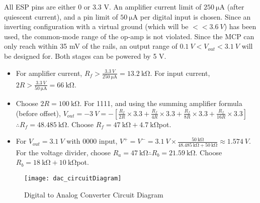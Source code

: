 All ESP pins are either 0 or 3.3 V. An amplifier current limit of $\SI{250}{\micro\ampere}$ (after quiescent current),
and a pin limit of $\SI{50}{\micro\ampere}$ per digital input is chosen. Since an inverting configuration with a virtual ground (which will be $<< \SI{3.6}{V}$) has been used,
the common-mode range of the op-amp is not violated. Since the MCP can only reach within 35 mV of the rails, an output range of $\SI{0.1}{V} < V_{out} < \SI{3.1}{V}$ will be designed for.
Both stages can be powered by 5 V.
\begin{itemize}
    \item For amplifier current, $R_f > \frac{\SI{3.3}{V}}{\SI{250}{\micro\ampere}} = \SI{13.2}{\kilo\ohm}$.
          For input current, $2R > \frac{\SI{3.3}{V}}{\SI{50}{\micro\ampere}} = \SI{66}{\kilo\ohm}$. 
    \item Choose $2R = \SI{100}{\kilo\ohm}$. For 1111, and using the summing amplifier formula (before offset),
          $V_{out} = \SI{-3}{V} = -\left[ \frac{R_f}{2R} \times 3.3 + \frac{R_f}{4R} \times 3.3 + \frac{R_f}{8R} \times 3.3 + \frac{R_f}{16R} \times 3.3 \right]$
          $\therefore R_f = \SI{48.485}{\kilo\ohm}$. Choose $R_f = \SI{47}{\kilo\ohm} + \SI{4.7}{\kilo\ohm}$pot.
    \item For $V_{out} = \SI{3.1}{V}$ with 0000 input, $V^+ = V^- = \SI{3.1}{V} \times \frac{\SI{50}{\kilo\ohm}}{\SI{48.485}{\kilo\ohm} + \SI{50}{\kilo\ohm}} \approx \SI{1.574}{V}$.
          For the voltage divider, choose $R_a = \SI{47}{\kilo\ohm} \therefore R_b = \SI{21.59}{\kilo\ohm}$. Choose $R_b = \SI{18}{\kilo\ohm} + \SI{10}{\kilo\ohm}$pot.
\end{itemize}

\begin{figure}[!htb]
  \centering
  \texttt{[image: dac\_circuitDiagram]}
  \caption{Digital to Analog Converter Circuit Diagram}
  \label{fig:dac_circuitDiagram}
\end{figure}